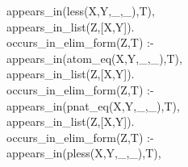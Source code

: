 \documentclass[11pt]{report}
\begin{document}
\begin{sf}
\begin{tabbing}
\hspace{6em}appears\_\hspace{0.1em}in(less(X,Y,\_\hspace{0.1em},\_\hspace{0.1em}),T),\\[-0.15ex]
\hspace{6em}appears\_\hspace{0.1em}in\_\hspace{0.1em}list(Z,[X,Y]).\\[-0.15ex]
occurs\_\hspace{0.1em}in\_\hspace{0.1em}elim\_\hspace{0.1em}form(Z,T) :- \\[-0.15ex]
\hspace{6em}appears\_\hspace{0.1em}in(atom\_\hspace{0.1em}eq(X,Y,\_\hspace{0.1em},\_\hspace{0.1em}),T),\\[-0.15ex]
\hspace{6em}appears\_\hspace{0.1em}in\_\hspace{0.1em}list(Z,[X,Y]).\\[-0.15ex]
occurs\_\hspace{0.1em}in\_\hspace{0.1em}elim\_\hspace{0.1em}form(Z,T) :- \\[-0.15ex]
\hspace{6em}appears\_\hspace{0.1em}in(pnat\_\hspace{0.1em}eq(X,Y,\_\hspace{0.1em},\_\hspace{0.1em}),T),\\[-0.15ex]
\hspace{6em}appears\_\hspace{0.1em}in\_\hspace{0.1em}list(Z,[X,Y]).\\[-0.15ex]
occurs\_\hspace{0.1em}in\_\hspace{0.1em}elim\_\hspace{0.1em}form(Z,T) :- \\[-0.15ex]
\hspace{6em}appears\_\hspace{0.1em}in(pless(X,Y,\_\hspace{0.1em},\_\hspace{0.1em}),T),\\[-0.15ex]

\end{tabbing}
\end{sf}
\end{document}
